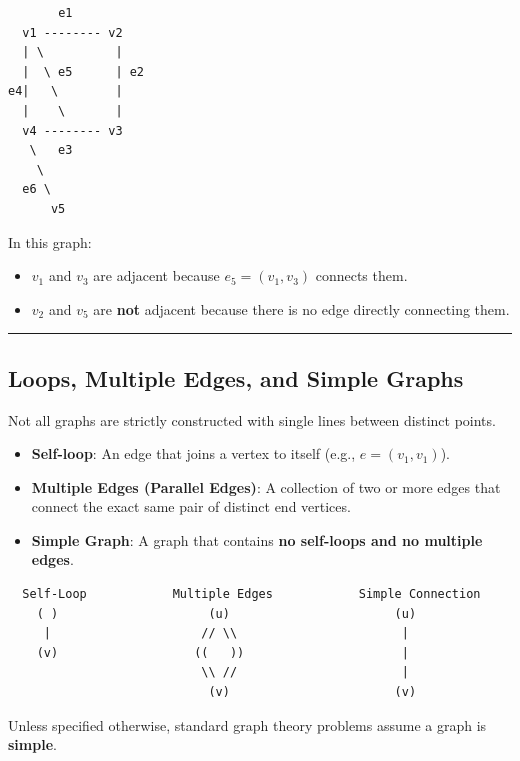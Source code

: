 \documentclass[
]{book}
\providecommand{\tightlist}{%
  \setlength{\itemsep}{0pt}\setlength{\parskip}{0pt}}
\theoremstyle{definition}
\theoremstyle{definition}
\theoremstyle{definition}
\theoremstyle{definition}
\theoremstyle{remark}
\begin{document}
\begin{verbatim}
       e1
  v1 -------- v2
  | \          |
  |  \ e5      | e2
e4|   \        |
  |    \       |
  v4 -------- v3
   \   e3
    \ 
  e6 \
      v5
\end{verbatim}

In this graph:

\begin{itemize}
\tightlist
\item
  \(v_1\) and \(v_3\) are adjacent because \(e_5 = (v_1, v_3)\) connects them.
\item
  \(v_2\) and \(v_5\) are \textbf{not} adjacent because there is no edge directly connecting them.
\end{itemize}

\begin{center}\rule{0.5\linewidth}{0.5pt}\end{center}

\subsection{Loops, Multiple Edges, and Simple Graphs}\label{loops-multiple-edges-and-simple-graphs}

Not all graphs are strictly constructed with single lines between distinct points.

\begin{itemize}
\tightlist
\item
  \textbf{Self-loop}: An edge that joins a vertex to itself (e.g., \(e = (v_1, v_1)\)).
\item
  \textbf{Multiple Edges (Parallel Edges)}: A collection of two or more edges that connect the exact same pair of distinct end vertices.
\item
  \textbf{Simple Graph}: A graph that contains \textbf{no self-loops and no multiple edges}.
\end{itemize}

\begin{verbatim}
  Self-Loop            Multiple Edges            Simple Connection
    ( )                     (u)                       (u)
     |                     // \\                       |
    (v)                   ((   ))                      |
                           \\ //                       |
                            (v)                       (v)
\end{verbatim}

Unless specified otherwise, standard graph theory problems assume a graph is \textbf{simple}.
\end{document}
